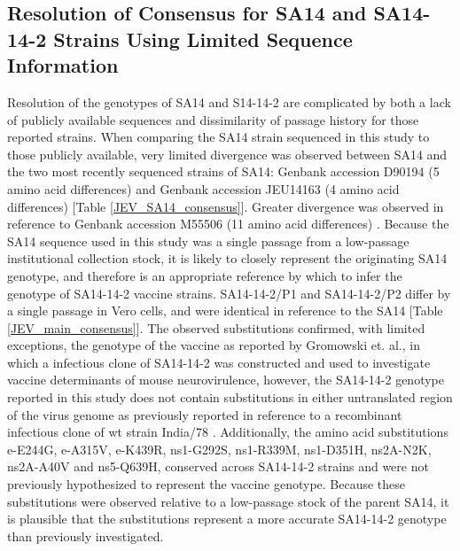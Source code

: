 \subsection{Resolution of Consensus for SA14 and SA14-14-2 Strains Using Limited Sequence Information}
Resolution of the genotypes of SA14 and S14-14-2 are complicated by both a lack of publicly available sequences and dissimilarity of passage history for those reported strains. When comparing the SA14 strain sequenced in this study to those publicly available, very limited divergence was observed between SA14 and the two most recently sequenced strains of SA14: Genbank accession D90194 (5 amino acid differences) \parencite{Aihara:1991tn} and Genbank accession JEU14163 (4 amino acid differences) [Table \ref{JEV_SA14_consensus}]. Greater divergence was observed in reference to Genbank accession M55506 (11 amino acid differences) \parencite{Nitayaphan:1990vr}. Because the SA14 sequence used in this study was a single passage from a low-passage institutional collection stock, it is likely to closely represent the originating SA14 genotype, and therefore is an appropriate reference by which to infer the genotype of SA14-14-2 vaccine strains.
SA14-14-2/P1 and SA14-14-2/P2 differ by a single passage in Vero cells, and were identical in reference to the SA14 [Table \ref{JEV_main_consensus}]. The observed substitutions confirmed, with limited exceptions, the genotype of the vaccine as reported by Gromowski et. al., in which a infectious clone of SA14-14-2 was constructed and used to investigate vaccine determinants of mouse neurovirulence, however, the SA14-14-2 genotype reported in this study does not contain substitutions in either untranslated region of the virus genome as previously reported in reference to a recombinant infectious clone of \gls{wt} strain India/78 \parencite{Gromowski:2015cg,Gromowski:2015et}. Additionally, the amino acid substitutions \gls{e}-E244G, \gls{e}-A315V, \gls{e}-K439R, \gls{ns}1-G292S, \gls{ns}1-R339M, \gls{ns}1-D351H, \gls{ns}2A-N2K, \gls{ns}2A-A40V and \gls{ns}5-Q639H, conserved across SA14-14-2 strains and were not previously hypothesized to represent the vaccine genotype. Because these substitutions were observed relative to a low-passage stock of the parent SA14, it is plausible that the substitutions represent a more accurate SA14-14-2 genotype than previously investigated.

